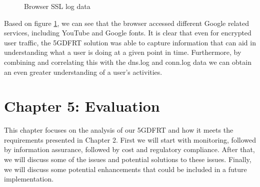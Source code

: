 \documentclass[final,1p,times,authoryear]{elsarticle}
\begin{document}
\begin{figure}[H]
  \centering
  \caption{Browser SSL log data}
  \label{fig:ssl-browser-traffic}
\end{figure}

Based on figure \ref{fig:ssl-browser-traffic}, we can see that the browser accessed different Google related services, including YouTube and Google fonts. It is clear that even for encrypted user traffic, the 5GDFRT solution was able to capture information that can aid in understanding what a user is doing at a given point in time. Furthermore, by combining and correlating this with the dns.log and conn.log data we can obtain an even greater understanding of a user's activities.

\newpage
\section{Chapter 5: Evaluation}
\label{sec5}
This chapter focuses on the analysis of our 5GDFRT and how it meets the requirements presented in Chapter 2. First we will start with monitoring, followed by information assurance, followed by cost and regulatory compliance. After that, we will discuss some of the issues and potential solutions to these issues. Finally, we will discuss some potential enhancements that could be included in a future implementation.
\end{document}
